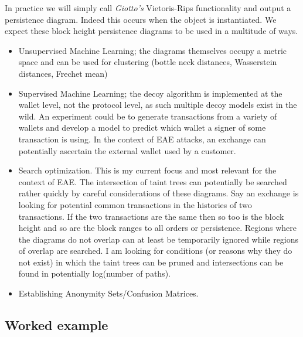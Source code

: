 In practice we will simply call \textit{Giotto's} Vietoris-Rips functionality and output a persistence diagram.  Indeed this occurs when the  object is instantiated.  We expect these block height persistence diagrams to be used in a multitude of ways.  
\begin{itemize}
\item Unsupervised Machine Learning; the diagrams themselves occupy a metric space and can be used for clustering (bottle neck distances, Wasserstein distances, Frechet mean)
\item Supervised Machine Learning; the decoy algorithm is implemented at the wallet level, not the protocol level, as such multiple decoy models exist in the wild.  An experiment could be to generate transactions from a variety of wallets and develop a model to predict which wallet a signer of some transaction is using.  In the context of EAE attacks, an exchange can potentially ascertain the external wallet used by a customer.
\item Search optimization.  This is my current focus and most relevant for the context of EAE.  The intersection of taint trees can potentially be searched rather quickly by careful considerations of these diagrams.  Say an exchange is looking for potential common transactions in the histories of two transactions.  If the two transactions are the same then so too is the block height and so are the block ranges to all orders or persistence.  Regions where the diagrams do not overlap can at least be temporarily ignored while regions of overlap are searched.  I am looking for conditions (or reasons why they do not exist) in which the taint trees can be pruned and intersections can be found in potentially log(number of paths).
\item Establishing Anonymity Sets/Confusion Matrices.

\end{itemize}

\subsection{Worked example}



